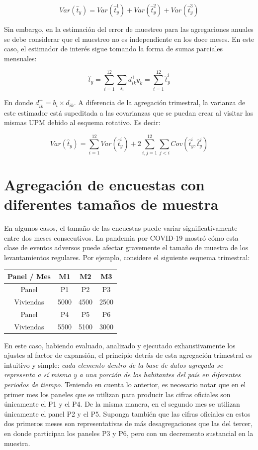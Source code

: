 \documentclass[
  12pt,
]{book}
\begin{document}
\[
Var(\hat{t}_y)
= Var(\hat{t}_{y}^1) + Var(\hat{t}_{y}^2) + Var(\hat{t}_{y}^3)
\]

Sin embargo, en la estimación del error de muestreo para las
agregaciones anuales se debe considerar que el muestreo no es
independiente en los doce meses. En este caso, el estimador de interés
sigue tomando la forma de sumas parciales mensuales:

\[
\hat{t}_y 
= \sum_{i=1}^{12}\sum_{s_i} d_{ik}^+ y_k 
= \sum_{i=1}^{12} \hat{t}_{y}^i
\]

En donde \(d_{ik}^+ = b_i \times d_{ik}\). A diferencia de la agregación trimestral, la varianza de este
estimador está supeditada a las covarianzas que se puedan crear al
visitar las mismas UPM debido al esquema rotativo. Es decir:

\[
Var(\hat{t}_y) 
= \sum_{i=1}^{12} Var(\hat{t}_{y}^i)
+ 2 \sum_{i,j=1}^{12} \sum_{j < i} Cov(\hat{t}_{y}^i, \hat{t}_{y}^j)
\]

\hypertarget{agregaciuxf3n-de-encuestas-con-diferentes-tamauxf1os-de-muestra}{%
\section{Agregación de encuestas con diferentes tamaños de muestra}\label{agregaciuxf3n-de-encuestas-con-diferentes-tamauxf1os-de-muestra}}

En algunos casos, el tamaño de las encuestas puede variar significativamente entre dos meses consecutivos. La pandemia por COVID-19 mostró cómo esta clase de eventos adversos puede afectar gravemente el tamaño de muestra de los levantamientos regulares. Por ejemplo, considere el siguiente esquema trimestral:

\begin{longtable}[]{@{}cccc@{}}
\toprule()
Panel / Mes & M1 & M2 & M3 \\
\midrule()
\endhead
Panel & P1 & P2 & P3 \\
Viviendas & 5000 & 4500 & 2500 \\
Panel & P4 & P5 & P6 \\
Viviendas & 5500 & 5100 & 3000 \\
\bottomrule()
\end{longtable}

En este caso, habiendo evaluado, analizado y ejecutado exhaustivamente los ajustes al factor de expansión, el principio detrás de esta agregación trimestral es intuitivo y simple: \emph{cada elemento dentro de la base de datos agregada se
representa a sí mismo y a una porción de los habitantes del país en
diferentes periodos de tiempo}. Teniendo en cuenta lo anterior, es
necesario notar que en el primer mes los paneles que se utilizan para
producir las cifras oficiales son únicamente el P1 y el P4. De la misma
manera, en el segundo mes se utilizan únicamente el panel P2 y el P5. Suponga también que las cifras oficiales en estos dos primeros meses son representativas de más desagregaciones que las del tercer, en donde participan los paneles P3 y P6, pero con un decremento sustancial en la muestra.
\end{document}
